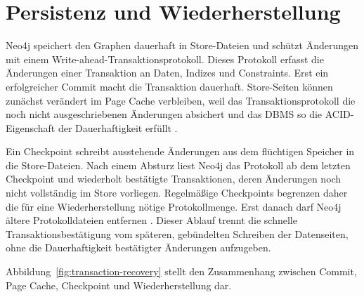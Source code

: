 \section{Persistenz und Wiederherstellung}

Neo4j speichert den Graphen dauerhaft in Store-Dateien und schützt Änderungen mit einem Write-ahead-Transaktionsprotokoll. Dieses Protokoll erfasst die Änderungen einer Transaktion an Daten, Indizes und Constraints. Erst ein erfolgreicher Commit macht die Transaktion dauerhaft. Store-Seiten können zunächst verändert im Page Cache verbleiben, weil das Transaktionsprotokoll die noch nicht ausgeschriebenen Änderungen absichert und das \ac{DBMS} so die \ac{ACID}-Eigenschaft der Dauerhaftigkeit erfüllt \cite{neo4j2026internals}.

Ein Checkpoint schreibt ausstehende Änderungen aus dem flüchtigen Speicher in die Store-Dateien. Nach einem Absturz liest Neo4j das Protokoll ab dem letzten Checkpoint und wiederholt bestätigte Transaktionen, deren Änderungen noch nicht vollständig im Store vorliegen. Regelmäßige Checkpoints begrenzen daher die für eine Wiederherstellung nötige Protokollmenge. Erst danach darf Neo4j ältere Protokolldateien entfernen \cite{neo4j2026checkpointing}. Dieser Ablauf trennt die schnelle Transaktionsbestätigung vom späteren, gebündelten Schreiben der Datenseiten, ohne die Dauerhaftigkeit bestätigter Änderungen aufzugeben.

Abbildung~\ref{fig:transaction-recovery} stellt den Zusammenhang zwischen Commit, Page Cache, Checkpoint und Wiederherstellung dar.

